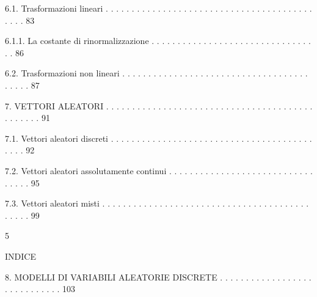 \documentclass[a4paper,portrait,12pt]{article}
\begin{document}
\begin{flushleft}
6.1. Trasformazioni lineari . . . . . . . . . . . . . . . . . . . . . . . . . . . . . . . . . . . . . . . . . . . . 83
\end{flushleft}


\begin{flushleft}
6.1.1. La costante di rinormalizzazione . . . . . . . . . . . . . . . . . . . . . . . . . . . . . . . . . 86
\end{flushleft}


\begin{flushleft}
6.2. Trasformazioni non lineari . . . . . . . . . . . . . . . . . . . . . . . . . . . . . . . . . . . . . . . . . 87
\end{flushleft}


\begin{flushleft}
7. VETTORI ALEATORI . . . . . . . . . . . . . . . . . . . . . . . . . . . . . . . . . . . . . . . . . . . . . . . 91
\end{flushleft}


\begin{flushleft}
7.1. Vettori aleatori discreti . . . . . . . . . . . . . . . . . . . . . . . . . . . . . . . . . . . . . . . . . . . 92
\end{flushleft}


\begin{flushleft}
7.2. Vettori aleatori assolutamente continui . . . . . . . . . . . . . . . . . . . . . . . . . . . . . . . . . 95
\end{flushleft}


\begin{flushleft}
7.3. Vettori aleatori misti . . . . . . . . . . . . . . . . . . . . . . . . . . . . . . . . . . . . . . . . . . . . . 99
\end{flushleft}


5










\begin{flushleft}
INDICE
\end{flushleft}





\begin{flushleft}
8. MODELLI DI VARIABILI ALEATORIE DISCRETE . . . . . . . . . . . . . . . . . . . . . . . . . . . . . 103
\end{flushleft}
\end{document}
